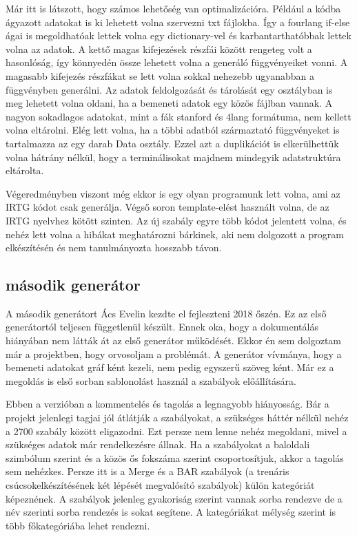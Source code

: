 Már itt is látszott, hogy számos lehetőség van optimalizációra. Például a kódba ágyazott adatokat is ki lehetett volna szervezni txt fájlokba. Így a fourlang if-else ágai is megoldhatóak lettek volna egy dictionary-vel és karbantarthatóbbak lettek volna az adatok. A kettő magas kifejezések részfái között rengeteg volt a hasonlóság, így könnyedén össze lehetett volna a generáló függvényeiket vonni. A magasabb kifejezés részfákat se lett volna sokkal nehezebb ugyanabban a függvényben generálni. Az adatok feldolgozását és tárolását egy osztályban is meg lehetett volna oldani, ha a bemeneti adatok egy közös fájlban vannak. A nagyon sokadlagos adatokat, mint a fák stanford és 4lang formátuma, nem kellett volna eltárolni. Elég lett volna, ha a többi adatból származtató függvényeket is tartalmazza az egy darab Data osztály. Ezzel azt a duplikációt is elkerülhettük volna hátrány nélkül, hogy a terminálisokat majdnem mindegyik adatstruktúra eltárolta.

Végeredményben viszont még ekkor is egy olyan programunk lett volna, ami az IRTG kódot csak generálja. Végső soron template-elést használt volna, de az IRTG nyelvhez kötött szinten. Az új szabály egyre több kódot jelentett volna, és nehéz lett volna a hibákat meghatározni bárkinek, aki nem dolgozott a program elkészítésén és nem tanulmányozta hosszabb távon.


\subsection{második generátor}
\label{sec:generator2}
A második generátort Ács Evelin kezdte el fejleszteni 2018 őszén.
Ez az első generátortól teljesen függetlenül készült.
Ennek oka, hogy a dokumentálás hiányában nem látták át az első generátor működését.
Ekkor én sem dolgoztam már a projektben, hogy orvosoljam a problémát.
A generátor vívmánya, hogy a bemeneti adatokat gráf ként kezeli, nem pedig egyszerű szöveg ként.
Már ez a megoldás is első sorban sablonolást használ a szabályok előállítására.

Ebben a verzióban a kommentelés és tagolás a legnagyobb hiányosság. 
Bár a projekt jelenlegi tagjai jól átlátják a szabályokat, a szükséges háttér nélkül nehéz a 2700 szabály között eligazodni. 
Ezt persze nem lenne nehéz megoldani, mivel a szükséges adatok már rendelkezésre állnak. 
Ha a szabályokat a baloldali szimbólum szerint és a közös ős fokszáma szerint csoportosítjuk, akkor a tagolás sem nehézkes. 
Persze itt is a Merge és a BAR szabályok (a trenáris csúcsokelkészítésének két lépését megvalósító szabályok) külön kategóriát képeznének. 
A szabályok jelenleg gyakoriság szerint vannak sorba rendezve de a név szerinti sorba rendezés is sokat segítene. 
A kategóriákat mélység szerint is több főkategóriába lehet rendezni.


